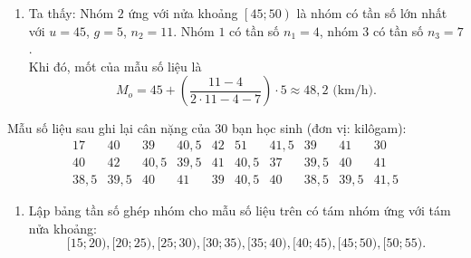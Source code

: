 \begin{bt}
{\begin{enumerate}
			\item Ta thấy: Nhóm $2$ ứng với nửa khoảng $\left[45;50\right)$ là nhóm có tần số lớn nhất với $u=45$, $g=5$, $n_2 = 11$. Nhóm $1$ có tần số $n_1 = 4$, nhóm $3$ có tần số $n_3 = 7$.\\
			      Khi đó, mốt của mẫu số liệu là
			      \[
				      M_o = 45 + \left( \dfrac{11 - 4}{2\cdot 11 - 4 - 7} \right) \cdot 5 \approx 48{,}2\text{ (km/h)}.
			      \]
		\end{enumerate}
	}
\end{bt}
\begin{bt}%
	Mẫu số liệu sau ghi lại cân nặng của $30$ bạn học sinh (đơn vị: kilôgam):
	\[
		\begin{array}{cccccccccc}
			17     & 40     & 39     & 40{,}5 & 42 & 51     & 41{,}5 & 39     & 41     & 30     \\
			40     & 42     & 40{,}5 & 39{,}5 & 41 & 40{,}5 & 37     & 39{,}5 & 40     & 41     \\
			38{,}5 & 39{,}5 & 40     & 41     & 39 & 40{,}5 & 40     & 38{,}5 & 39{,}5 & 41{,}5
		\end{array}
	\]
	\begin{enumerate}
		\item Lập bảng tần số ghép nhóm cho mẫu số liệu trên có tám nhóm ứng với tám nửa khoảng:
		      \[
			      [15 ; 20),[20 ; 25),[25 ; 30),[30 ; 35),[35 ; 40),[40 ; 45),[45 ; 50),[50 ; 55).
		      \]


\end{enumerate}
\end{bt}
